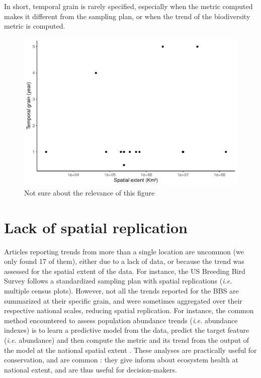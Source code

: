 \documentclass[
  12pt,
  oneside]{report}
\begin{document}
In short, temporal grain is rarely specified, especially when the metric computed makes it different from the sampling plan, or when the trend of the biodiversity metric is computed.

\begin{figure}
\centering
\includegraphics{literature_review_files/figure-latex/spacetimegrain-1.pdf}
\caption{\label{fig:spacetimegrain}Not sure about the relevance of this figure}
\end{figure}

\hypertarget{lack-of-spatial-replication}{%
\chapter{Lack of spatial replication}\label{lack-of-spatial-replication}}

Articles reporting trends from more than a single location are uncommon (we only found 17 of them), either due to a lack of data, or because the trend was assessed for the spatial extent of the data. For instance, the US Breeding Bird Survey \autocites[\emph{e.g.}][]{kamp_population_2021,sauer_north_2013} follows a standardized sampling plan with spatial replications (\emph{i.e.} multiple census plots). However, not all the trends reported for the BBS are summarized at their specific grain, and were sometimes aggregated over their respective national scales, reducing spatial replication. For instance, the common method encountered to assess population abundance trends (\emph{i.e.} abundance indexes) is to learn a predictive model from the data, predict the target feature (\emph{i.e.} abundance) and then compute the metric and its trend from the output of the model at the national spatial extent \autocites[\emph{e.g.}][]{doxa_low-intensity_2010,eglington_disentangling_2012,jiguet_french_2012,jiguet_modeling_2005,sauer_first_2017}. These analyses are practically useful for conservation, and are common \autocite{fraixedas_state_2020}: they give inform about ecosystem health at national extent, and are thus useful for decision-makers.
\end{document}
